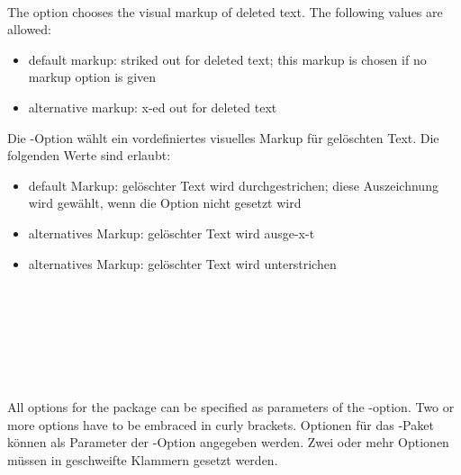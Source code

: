 \\

\ifENGLISH
	The  option chooses the visual markup of deleted text.
	The following values are allowed:
	\begin{itemize}
		\item {} default markup: striked out for deleted text; this markup is chosen if no markup option is given
		\item {} alternative markup: x-ed out for deleted text
	\end{itemize}
\fi
	\ifGERMAN
	Die -Option wählt ein vordefiniertes visuelles Markup für gelöschten Text.
	Die folgenden Werte sind erlaubt:
	\begin{itemize}
		\item {} default Markup: gelöschter Text wird durchgestrichen; diese Auszeichnung wird gewählt, wenn die Option nicht gesetzt wird
		\item {} alternatives Markup: gelöschter Text wird ausge-x-t
		\item {} alternatives Markup: gelöschter Text wird unterstrichen
	\end{itemize}
	\fi

\\
\\

\\
\\
\\

\ifENGLISH
	All options for the  package can be specified as parameters of the -option.
	Two or more options have to be embraced in curly brackets.
\fi
	\ifGERMAN
		Optionen für das -Paket können als Parameter der -Option angegeben werden.
		Zwei oder mehr Optionen müssen in geschweifte Klammern gesetzt werden.
	\fi

\\

